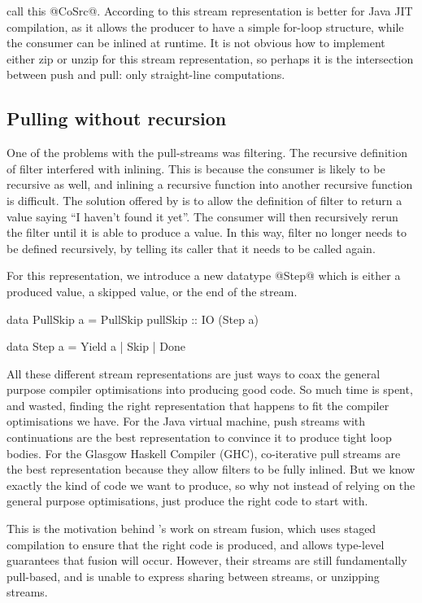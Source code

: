 \citet{bernardy2015duality} call this @CoSrc@.
According to \citet{biboudis2017expressive} this stream representation is better for Java JIT compilation, as it allows the producer to have a simple for-loop structure, while the consumer can be inlined at runtime.
It is not obvious how to implement either zip or unzip for this stream representation, so perhaps it is the intersection between push and pull: only straight-line computations.

\subsection{Pulling without recursion}
\label{sec:process:streams:stream-fusion}
One of the problems with the pull-streams was filtering.
The recursive definition of filter interfered with inlining.
This is because the consumer is likely to be recursive as well, and inlining a recursive function into another recursive function is difficult.
The solution offered by \citet{coutts2007stream} is to allow the definition of filter to return a value saying ``I haven't found it yet''.
The consumer will then recursively rerun the filter until it is able to produce a value.
In this way, filter no longer needs to be defined recursively, by telling its caller that it needs to be called again.

For this representation, we introduce a new datatype @Step@ which is either a produced value, a skipped value, or the end of the stream.

\begin{code}
data PullSkip a
  = PullSkip
  { pullSkip :: IO (Step a) }

data Step a
  = Yield a | Skip | Done
\end{code}

All these different stream representations are just ways to coax the general purpose compiler optimisations into producing good code.
So much time is spent, and wasted, finding the right representation that happens to fit the compiler optimisations we have.
For the Java virtual machine, push streams with continuations are the best representation to convince it to produce tight loop bodies.
For the Glasgow Haskell Compiler (GHC), co-iterative pull streams are the best representation because they allow filters to be fully inlined.
But we know exactly the kind of code we want to produce, so why not instead of relying on the general purpose optimisations, just produce the right code to start with.

This is the motivation behind \citet{kiselyov2016stream}'s work on stream fusion, which uses staged compilation to ensure that the right code is produced, and allows type-level guarantees that fusion will occur.
However, their streams are still fundamentally pull-based, and is unable to express sharing between streams, or unzipping streams.

